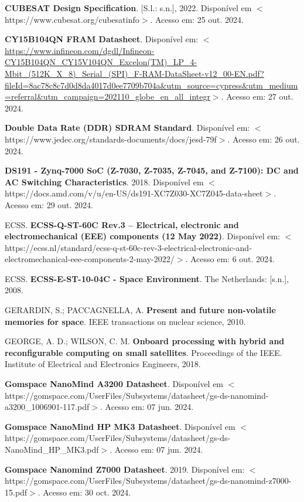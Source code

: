 \begin{flushleft}
\begin{thebibliography}{00}
 \textbf{CUBESAT Design Specification}. [S.l.: s.n.], 2022. Disponível em $<$https://www.cubesat.org/cubesatinfo$>$. Acesso em: 25 out. 2024.

 \textbf{CY15B104QN FRAM Datasheet}. Disponível em: $<$\url{https://www.infineon.com/dgdl/Infineon-CY15B104QN\_CY15V104QN\_Excelon(TM)\_LP\_4-Mbit\_(512K\_X\_8)\_Serial\_(SPI)\_F-RAM-DataSheet-v12\_00-EN.pdf?fileId=8ac78c8c7d0d8da4017d0ee7709b704a\&utm\_source=cypress\&utm\_medium=referral\&utm\_campaign=202110\_globe\_en\_all\_integr}$>$. Acesso em: 27 out. 2024.

 \textbf{Double Data Rate (DDR) SDRAM Standard}. Disponível em: $<$https://www.jedec.org/standards-documents/docs/jesd-79f$>$. Acesso em: 26 out. 2024.

 \textbf{DS191 - Zynq-7000 SoC (Z-7030, Z-7035, Z-7045, and Z-7100): DC and AC Switching Characteristics}. 2018. Disponível em $<$https://docs.amd.com/v/u/en-US/ds191-XC7Z030-XC7Z045-data-sheet$>$. Acesso em: 29 out. 2024.

 ECSS. \textbf{ECSS-Q-ST-60C Rev.3 – Electrical, electronic and electromechanical (EEE) components (12 May 2022)}. Disponível em: $<$https://ecss.nl/standard/ecss-q-st-60c-rev-3-electrical-electronic-and-electromechanical-eee-components-2-may-2022/$>$. Acesso em: 6 out. 2024.

 ECSS. \textbf{ECSS-E-ST-10-04C - Space Environment}. The Netherlands: [s.n.], 2008.

 GERARDIN, S.; PACCAGNELLA, A. \textbf{Present and future non-volatile memories for space}. IEEE transactions on nuclear science, 2010.

 GEORGE, A. D.; WILSON, C. M. \textbf{Onboard processing with hybrid and reconfigurable computing on small satellites}. Proceedings of the IEEE. Institute of Electrical and Electronics Engineers, 2018.

 \textbf{Gomspace NanoMind A3200 Datasheet}. Disponível em $<$https://gomspace.com/UserFiles/Subsystems/datasheet/gs-ds-nanomind-a3200\_1006901-117.pdf$>$. Acesso em: 07 jun. 2024.

 \textbf{Gomspace NanoMind HP MK3 Datasheet}. Disponível em $<$https://gomspace.com/UserFiles/Subsystems/datasheet/gs-ds-NanoMind\_HP\_MK3.pdf$>$. Acesso em: 07 jun. 2024.

 \textbf{Gomspace Nanomind Z7000 Datasheet}. 2019. Disponível em: $<$https://gomspace.com/UserFiles/Subsystems/datasheet/gs-ds-nanomind-z7000-15.pdf$>$. Acesso em: 30 oct. 2024.


\end{thebibliography}
\end{flushleft}
